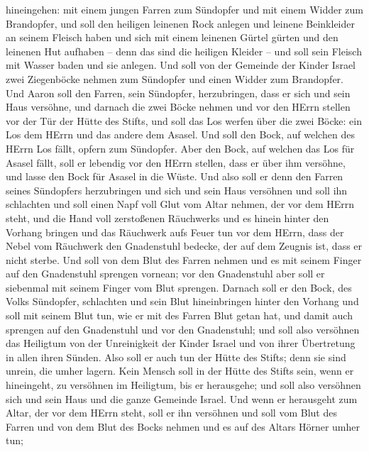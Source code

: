 hineingehen: mit einem jungen Farren zum Sündopfer und mit einem Widder
zum Brandopfer,  und soll den heiligen leinenen Rock anlegen
und leinene Beinkleider an seinem Fleisch haben und sich mit einem
leinenen Gürtel gürten und den leinenen Hut aufhaben -- denn das sind
die heiligen Kleider -- und soll sein Fleisch mit Wasser baden und sie
anlegen.  Und soll von der Gemeinde der Kinder Israel zwei
Ziegenböcke nehmen zum Sündopfer und einen Widder zum Brandopfer.
 Und Aaron soll den Farren, sein Sündopfer, herzubringen,
dass er sich und sein Haus versöhne,  und darnach die zwei
Böcke nehmen und vor den HErrn stellen vor der Tür der Hütte des Stifts,
 und soll das Los werfen über die zwei Böcke: ein Los dem
HErrn und das andere dem Asasel.  Und soll den Bock, auf
welchen des HErrn Los fällt, opfern zum Sündopfer.  Aber
den Bock, auf welchen das Los für Asasel fällt, soll er lebendig vor den
HErrn stellen, dass er über ihm versöhne, und lasse den Bock für Asasel
in die Wüste.  Und also soll er denn den Farren seines
Sündopfers herzubringen und sich und sein Haus versöhnen und soll ihn
schlachten  und soll einen Napf voll Glut vom Altar nehmen,
der vor dem HErrn steht, und die Hand voll zerstoßenen Räuchwerks und es
hinein hinter den Vorhang bringen  und das Räuchwerk aufs
Feuer tun vor dem HErrn, dass der Nebel vom Räuchwerk den Gnadenstuhl
bedecke, der auf dem Zeugnis ist, dass er nicht sterbe. 
Und soll von dem Blut des Farren nehmen und es mit seinem Finger auf den
Gnadenstuhl sprengen vornean; vor den Gnadenstuhl aber soll er siebenmal
mit seinem Finger vom Blut sprengen.  Darnach soll er den
Bock, des Volks Sündopfer, schlachten und sein Blut hineinbringen hinter
den Vorhang und soll mit seinem Blut tun, wie er mit des Farren Blut
getan hat, und damit auch sprengen auf den Gnadenstuhl und vor den
Gnadenstuhl;  und soll also versöhnen das Heiligtum von der
Unreinigkeit der Kinder Israel und von ihrer Übertretung in allen ihren
Sünden. Also soll er auch tun der Hütte des Stifts; denn sie sind
unrein, die umher lagern.  Kein Mensch soll in der Hütte
des Stifts sein, wenn er hineingeht, zu versöhnen im Heiligtum, bis er
herausgehe; und soll also versöhnen sich und sein Haus und die ganze
Gemeinde Israel.  Und wenn er herausgeht zum Altar, der vor
dem HErrn steht, soll er ihn versöhnen und soll vom Blut des Farren und
von dem Blut des Bocks nehmen und es auf des Altars Hörner umher tun;
